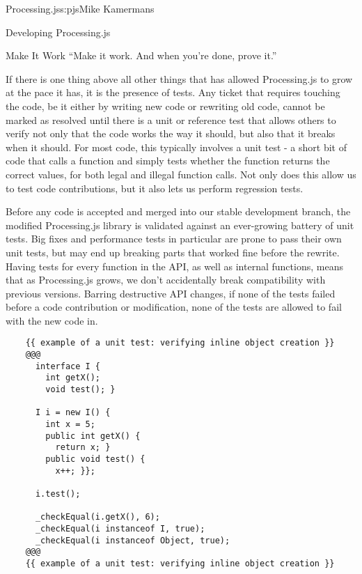 \begin{aosachapter}{Processing.js}{s:pjs}{Mike Kamermans}
\begin{aosasect1}{Developing Processing.js}
\begin{aosasect2}{Make It Work}
``Make it work. And when you're done, prove it.''

If there is one thing above all other things that has allowed
Processing.js to grow at the pace it has, it is the presence of
tests. Any ticket that requires touching the code, be it either by
writing new code or rewriting old code, cannot be marked as resolved
until there is a unit or reference test that allows others to verify
not only that the code works the way it should, but also that it
breaks when it should. For most code, this typically involves a unit
test - a short bit of code that calls a function and simply tests
whether the function returns the correct values, for both legal and
illegal function calls. Not only does this allow us to test code
contributions, but it also lets us perform regression tests.

Before any code is accepted and merged into our stable development
branch, the modified Processing.js library is validated against an
ever-growing battery of unit tests. Big fixes and performance tests in
particular are prone to pass their own unit tests, but may end up
breaking parts that worked fine before the rewrite. Having tests for
every function in the API, as well as internal functions, means that
as Processing.js grows, we don't accidentally break compatibility with
previous versions. Barring destructive API changes, if none of the
tests failed before a code contribution or modification, none of the
tests are allowed to fail with the new code in.

\begin{verbatim}
    {{ example of a unit test: verifying inline object creation }}
    @@@
      interface I {
        int getX();
        void test(); }

      I i = new I() {
        int x = 5;
        public int getX() {
          return x; }
        public void test() {
          x++; }};

      i.test();

      _checkEqual(i.getX(), 6);
      _checkEqual(i instanceof I, true);
      _checkEqual(i instanceof Object, true);
    @@@
    {{ example of a unit test: verifying inline object creation }}
\end{verbatim}


\end{aosasect2}
\end{aosasect1}
\end{aosachapter}
